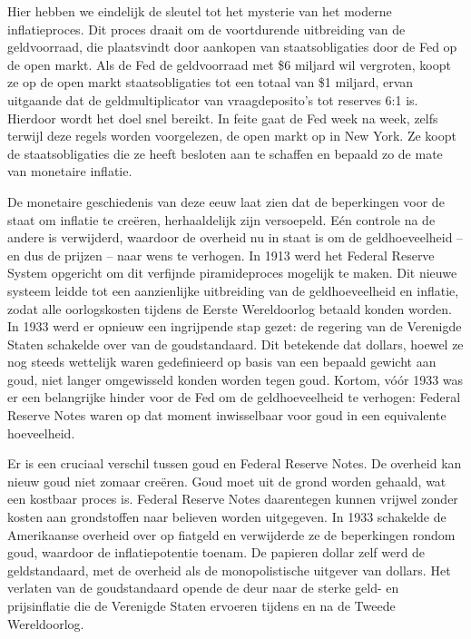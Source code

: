 \documentclass[
  a5paper,
  smalldemyvopaper,10pt,twoside,onecolumn,openright,extrafontsizes,hidelinks]{memoir}
\begin{document}
Hier hebben we eindelijk de sleutel tot het mysterie van het moderne
inflatieproces. Dit proces draait om de voortdurende uitbreiding van de
geldvoorraad, die plaatsvindt door aankopen van staatsobligaties door de
Fed op de open markt. Als de Fed de geldvoorraad met \$6 miljard wil
vergroten, koopt ze op de open markt staatsobligaties tot een totaal van
\$1 miljard, ervan uitgaande dat de geldmultiplicator van
vraagdeposito's tot reserves 6:1 is. Hierdoor wordt het doel snel
bereikt. In feite gaat de Fed week na week, zelfs terwijl deze regels
worden voorgelezen, de open markt op in New York. Ze koopt de
staatsobligaties die ze heeft besloten aan te schaffen en bepaald zo de
mate van monetaire inflatie.

De monetaire geschiedenis van deze eeuw laat zien dat de beperkingen
voor de staat om inflatie te creëren, herhaaldelijk zijn versoepeld. Eén
controle na de andere is verwijderd, waardoor de overheid nu in staat is
om de geldhoeveelheid -- en dus de prijzen -- naar wens te verhogen. In
1913 werd het Federal Reserve System opgericht om dit verfijnde
piramideproces mogelijk te maken. Dit nieuwe systeem leidde tot een
aanzienlijke uitbreiding van de geldhoeveelheid en inflatie, zodat alle
oorlogskosten tijdens de Eerste Wereldoorlog betaald konden worden. In
1933 werd er opnieuw een ingrijpende stap gezet: de regering van de
Verenigde Staten schakelde over van de goudstandaard. Dit betekende dat
dollars, hoewel ze nog steeds wettelijk waren gedefinieerd op basis van
een bepaald gewicht aan goud, niet langer omgewisseld konden worden
tegen goud. Kortom, vóór 1933 was er een belangrijke hinder voor de Fed
om de geldhoeveelheid te verhogen: Federal Reserve Notes waren op dat
moment inwisselbaar voor goud in een equivalente hoeveelheid.

Er is een cruciaal verschil tussen goud en Federal Reserve Notes. De
overheid kan nieuw goud niet zomaar creëren. Goud moet uit de grond
worden gehaald, wat een kostbaar proces is. Federal Reserve Notes
daarentegen kunnen vrijwel zonder kosten aan grondstoffen naar believen
worden uitgegeven. In 1933 schakelde de Amerikaanse overheid over op
fiatgeld en verwijderde ze de beperkingen rondom goud, waardoor de
inflatiepotentie toenam. De papieren dollar zelf werd de geldstandaard,
met de overheid als de monopolistische uitgever van dollars. Het
verlaten van de goudstandaard opende de deur naar de sterke geld- en
prijsinflatie die de Verenigde Staten ervoeren tijdens en na de Tweede
Wereldoorlog.
\end{document}
